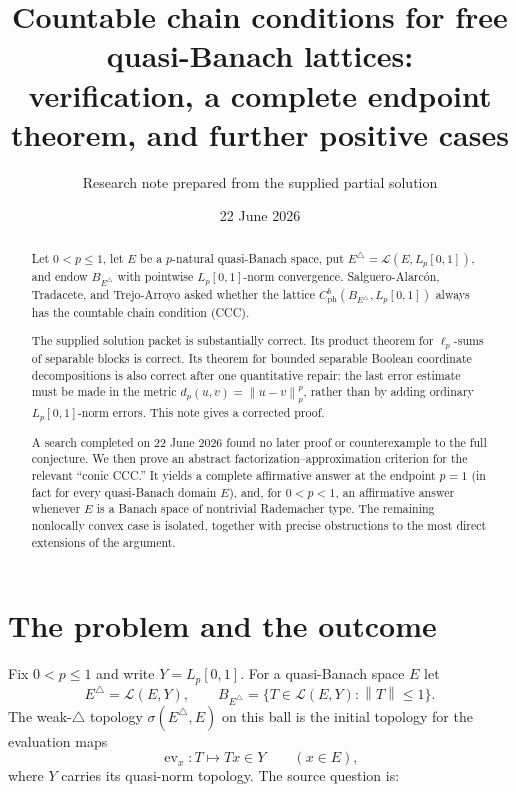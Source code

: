 \documentclass[11pt]{article}
\title{Countable chain conditions for free quasi-Banach lattices:\\
verification, a complete endpoint theorem, and further positive cases}
\author{Research note prepared from the supplied partial solution}
\date{22 June 2026}
\theoremstyle{definition}
\newcommand{\Lp}{L_p[0,1]}
\newcommand{\cph}{C_{\mathrm{ph}}^b}
\newcommand{\calL}{\mathcal L}
\newcommand{\norm}[1]{\left\lVert #1\right\rVert}
\begin{document}
\maketitle

\begin{center}
\end{center}

\begin{abstract}
Let $0<p\leq 1$, let $E$ be a $p$-natural quasi-Banach space, put
$E^\triangle=\calL(E,\Lp)$, and endow $B_{E^\triangle}$ with pointwise
$\Lp$-norm convergence.  Salguero-Alarc\'on, Tradacete, and Trejo-Arroyo
asked whether the lattice $\cph(B_{E^\triangle},\Lp)$ always has the
countable chain condition (CCC).

The supplied solution packet is substantially correct.  Its product theorem for
$\ell_p$-sums of separable blocks is correct.  Its theorem for bounded separable
Boolean coordinate decompositions is also correct after one quantitative repair:
the last error estimate must be made in the metric
$d_p(u,v)=\norm{u-v}_p^p$, rather than by adding ordinary $\Lp$-norm errors.
This note gives a corrected proof.

A search completed on 22 June 2026 found no later proof or counterexample to the
full conjecture.  We then prove an abstract factorization--approximation criterion
for the relevant ``conic CCC.''  It yields a complete affirmative answer at the
endpoint $p=1$ (in fact for every quasi-Banach domain $E$), and, for $0<p<1$,
an affirmative answer whenever $E$ is a Banach space of nontrivial Rademacher
type.  The remaining nonlocally convex case is isolated, together with precise
obstructions to the most direct extensions of the argument.
\end{abstract}

\tableofcontents

\section{The problem and the outcome}

Fix $0<p\leq 1$ and write $Y=\Lp$.  For a quasi-Banach space $E$ let
\[
 E^\triangle=\calL(E,Y),\qquad
 B_{E^\triangle}=\{T\in\calL(E,Y):\norm{T}\leq 1\}.
\]
The weak-$\triangle$ topology $\sigma(E^\triangle,E)$ on this ball is the
initial topology for the evaluation maps
\[
 \operatorname{ev}_x:T\longmapsto Tx\in Y\qquad(x\in E),
\]
where $Y$ carries its quasi-norm topology.  The source question is:
\end{document}
